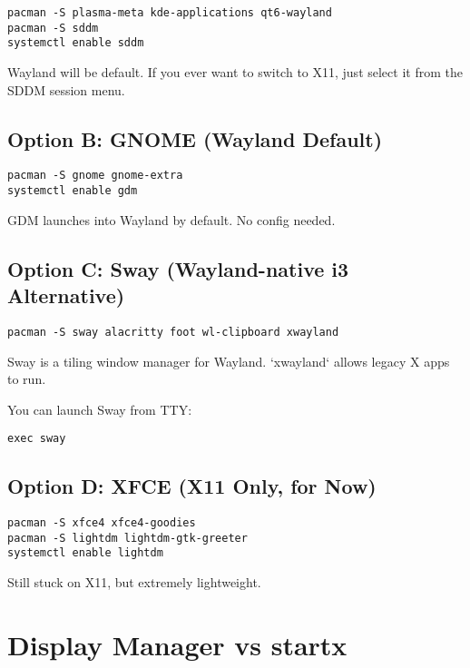\documentclass[12pt,openany]{book}
\begin{document}
\begin{lstlisting}
pacman -S plasma-meta kde-applications qt6-wayland
pacman -S sddm
systemctl enable sddm
\end{lstlisting}

Wayland will be default. If you ever want to switch to X11, just select it from the SDDM session menu.

\subsection*{Option B: GNOME (Wayland Default)}

\begin{lstlisting}
pacman -S gnome gnome-extra
systemctl enable gdm
\end{lstlisting}

GDM launches into Wayland by default. No config needed.

\subsection*{Option C: Sway (Wayland-native i3 Alternative)}

\begin{lstlisting}
pacman -S sway alacritty foot wl-clipboard xwayland
\end{lstlisting}

Sway is a tiling window manager for Wayland. `xwayland` allows legacy X apps to run.

You can launch Sway from TTY:

\begin{lstlisting}
exec sway
\end{lstlisting}

\subsection*{Option D: XFCE (X11 Only, for Now)}

\begin{lstlisting}
pacman -S xfce4 xfce4-goodies
pacman -S lightdm lightdm-gtk-greeter
systemctl enable lightdm
\end{lstlisting}

Still stuck on X11, but extremely lightweight.

\section{Display Manager vs startx}
\end{document}
